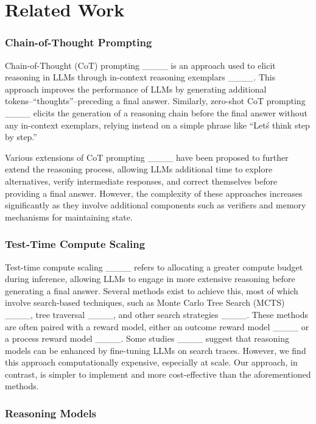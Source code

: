 \section{Related Work}
\subsubsection{Chain-of-Thought Prompting}

Chain-of-Thought (CoT) prompting ____ is an approach used to elicit reasoning in LLMs through in-context reasoning exemplars ____. This approach improves the performance of LLMs by generating additional tokens--``thoughts''--preceding a final answer. Similarly, zero-shot CoT prompting ____ elicits the generation of a reasoning chain before the final answer without any in-context exemplars, relying instead on a simple phrase like ``Let\'s think step by step.''

Various extensions of CoT prompting ____ have been proposed to further extend the reasoning process, allowing LLMs additional time to explore alternatives, verify intermediate responses, and correct themselves before providing a final answer. However, the complexity of these approaches increases significantly as they involve additional components such as verifiers and memory mechanisms for maintaining state.

\subsubsection{Test-Time Compute Scaling}

Test-time compute scaling ____ refers to allocating a greater compute budget during inference, allowing LLMs to engage in more extensive reasoning before generating a final answer. Several methods exist to achieve this, most of which involve search-based techniques, such as Monte Carlo Tree Search (MCTS) ____, tree traversal ____, and other search strategies ____. These methods are often paired with a reward model, either an outcome reward model ____ or a process reward model ____. Some studies ____ suggest that reasoning models can be enhanced by fine-tuning LLMs on search traces. However, we find this approach computationally expensive, especially at scale. Our approach, in contrast, is simpler to implement and more cost-effective than the aforementioned methods.

\subsubsection{Reasoning Models}

